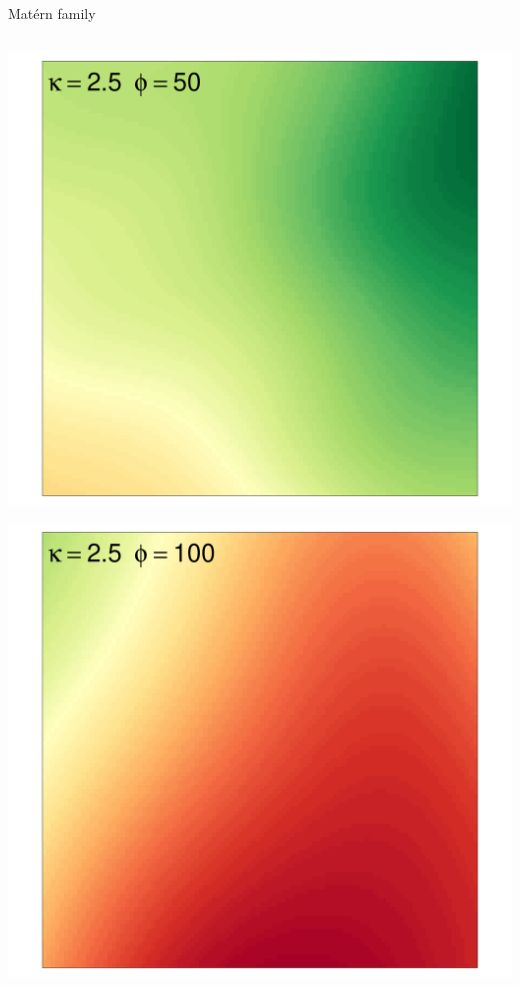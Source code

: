 \documentclass[
  ignorenonframetext,
]{beamer}
\begin{document}
\begin{frame}{Matérn family}
\begin{columns}[T]
\begin{column}{0.33\textwidth}
\includegraphics{Lecture_1_files/figure-beamer/unnamed-chunk-42-1.pdf}

\includegraphics{Lecture_1_files/figure-beamer/unnamed-chunk-43-1.pdf}
\end{column}
\end{columns}
\end{frame}
\end{document}
